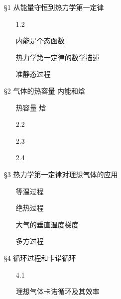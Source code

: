 \documentclass[CJK]{beamer}
\begin{document}
\begin{frame}
\bch
\S{1} 从能量守恒到热力学第一定律
\begin{itemize}
\item[\greentext{1.1}]{}
\item[1.2]{}
\item[\blacktext{1.3}]{内能是个态函数}
\item[\blacktext{1.4}]{热力学第一定律的数学描述}
\item[\blacktext{1.5}]{准静态过程}
\end{itemize}

\S{2} 气体的热容量 内能和焓
\begin{itemize}
\item[\blacktext{2.1}]{热容量 焓}
\item[2.2]{}
\item[2.3]{}
\item[2.4]{}
\item[\greentext{2.5}]{}
\end{itemize}

\ech
\end{frame}


\begin{frame}
\bch
\S{3} 热力学第一定律对理想气体的应用
\begin{itemize}
\item[\blacktext{3.1}]{等温过程}
\item[\blacktext{3.2}]{绝热过程}
\item[\blacktext{3.3}]{大气的垂直温度梯度}
\item[\blacktext{3.4}]{多方过程}
\end{itemize}

\S{4} 循环过程和卡诺循环
\begin{itemize}
\item[4.1]{}
\item[\blacktext{4.2}]{理想气体卡诺循环及其效率}
\end{itemize}

\ech
\end{frame}
\end{document}
